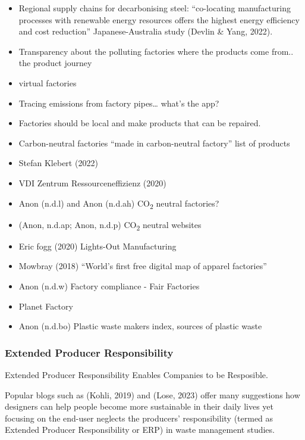 \documentclass[
  letterpaper,
  DIV=11,
  numbers=noendperiod]{scrartcl}
\begin{document}
\begin{itemize}
\item
  Regional supply chains for decarbonising steel: ``co-locating
  manufacturing processes with renewable energy resources offers the
  highest energy efficiency and cost reduction'' Japanese-Australia
  study (Devlin \& Yang, 2022).
\item
  Transparency about the polluting factories where the products come
  from.. the product journey
\item
  virtual factories
\item
  Tracing emissions from factory pipes\ldots{} what's the app?
\item
  Factories should be local and make products that can be repaired.
\item
  Carbon-neutral factories ``made in carbon-neutral factory'' list of
  products
\item
  Stefan Klebert (2022)
\item
  VDI Zentrum Ressourceneffizienz (2020)
\item
  Anon (n.d.l) and Anon (n.d.ah) CO\textsubscript{2} neutral factories?
\item
  (Anon, n.d.ap; Anon, n.d.p) CO\textsubscript{2} neutral websites
\item
  Eric fogg (2020) Lights-Out Manufacturing
\item
  Mowbray (2018) ``World's first free digital map of apparel factories''
\item
  Anon (n.d.w) Factory compliance - Fair Factories
\item
  Planet Factory
\item
  Anon (n.d.bo) Plastic waste makers index, sources of plastic waste
\end{itemize}

\subsubsection{Extended Producer
Responsibility}\label{extended-producer-responsibility}

Extended Producer Responsibility Enables Companies to be Resposible.

Popular blogs such as (Kohli, 2019) and (Lose, 2023) offer many
suggestions how designers can help people become more sustainable in
their daily lives yet focusing on the end-user neglects the producers'
responsibility (termed as Extended Producer Responsibility or ERP) in
waste management studies.
\end{document}
